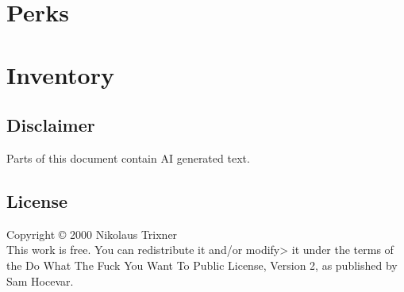 \documentclass[a4paper]{book}
\begin{document}
    \part{Perks}\label{part:perks}
    
    
    
    
    
    
    

    \part{Inventory}\label{part:inventory}
    
    
    
    

    \begin{appendices}
        
        
        

        \chapter{Disclaimer}\label{chapter:disclaimer}
        Parts of this document contain AI generated text.

        \chapter{License}\label{chapter:license}
        Copyright © 2000 Nikolaus Trixner\\
        This work is free.
        You can redistribute it and/or modify> it under the terms of the Do What The Fuck You Want To Public License, Version 2, as published by Sam Hocevar.
    \end{appendices}
\end{document}
